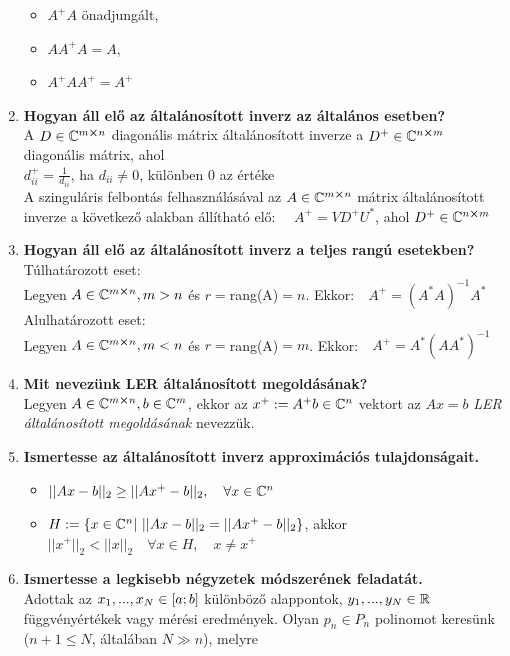 \documentclass{article}
\begin{document}
\begin{enumerate}
\begin{itemize}
		\item $A^+A$ önadjungált,
		\item $AA^+A=A$,
		\item $A^+AA^+=A^+$
	\end{itemize}
	\item\textbf{Hogyan áll elő az általánosított inverz az általános esetben?}\\[0.1cm]
	A $D\in\mathbb{C}^{m\cross n}$ diagonális mátrix általánosított inverze a $D^+\in\mathbb{C}^{n\cross m}$
	diagonális mátrix, ahol\\[0.1cm]$d_{ii}^+=\frac{1}{d_{ii}}$, ha $d_{ii}\neq0$,
	különben 0 az értéke
	\\[0.1cm]A szinguláris felbontás felhasználásával az $A\in\mathbb{C}^{m\cross n}$ mátrix
	általánosított inverze a következő alakban állítható elő: $\quad A^+=VD^+U^*$, ahol
	$D^+\in\mathbb{C}^{n\cross m}$
	\item\textbf{Hogyan áll elő az általánosított inverz a teljes rangú esetekben?}\\[0.1cm]
	Túlhatározott eset:\\[0.1cm]
	Legyen $A\in\mathbb{C}^{m\cross n},m>n$ és $r=$rang(A)$=n$. Ekkor:$\quad A^+=(A^*A)^{-1}A^*$
	\\[0.1cm]Alulhatározott eset:\\[0.1cm]
	Legyen $A\in\mathbb{C}^{m\cross n},m<n$ és $r=$rang(A)$=m$. Ekkor:$\quad A^+=A^*(AA^*)^{-1}$
	\item\textbf{Mit nevezünk LER általánosított megoldásának?}\\[0.1cm]
	Legyen $A\in\mathbb{C}^{m\cross n},b\in\mathbb{C}^m$, ekkor az $x^+:=A^+b\in\mathbb{C}^n$ vektort az
	$Ax=b$ \textit{LER általánosított megoldásának} nevezzük.
	\item\textbf{Ismertesse az általánosított inverz approximációs tulajdonságait.}
	\begin{itemize}
		\item $||Ax-b||_2\geq||Ax^+-b||_2,\quad\forall x\in\mathbb{C}^n$
		\item $H:=\{x\in\mathbb{C}^n|\text{  }||Ax-b||_2=||Ax^+-b||_2\}$, akkor\\[0.1cm]
		$||x^+||_2<||x||_2\quad\forall x\in H,\quad x\neq x^+$
	\end{itemize}
	\item\textbf{Ismertesse a legkisebb négyzetek módszerének feladatát.}\\[0.1cm]
	Adottak az $x_1,...,x_N\in[a;b]$ különböző alappontok, $y_1,...,y_N\in\mathbb{R}$
	függvényértékek vagy mérési eredmények. Olyan $p_n\in P_n$ polinomot keresünk
	($n+1\leq N$, általában $N\gg n$), melyre\\[0.1cm]

\end{enumerate}
\end{document}
